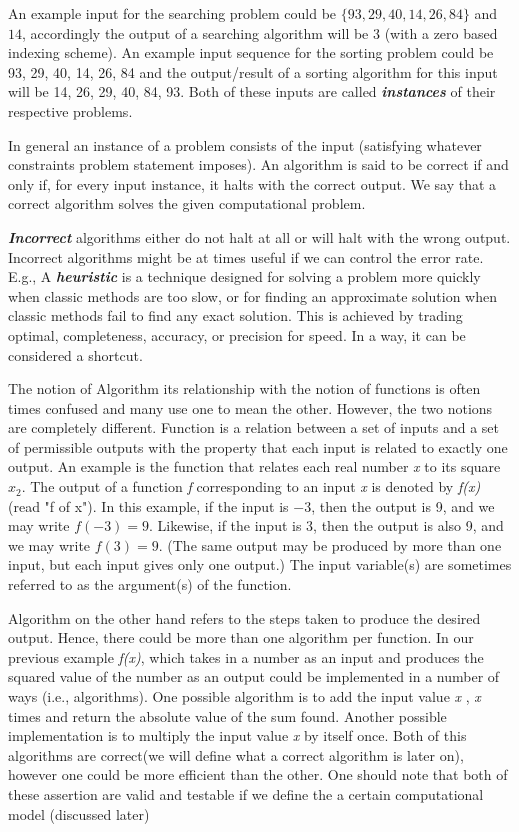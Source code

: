 \documentclass[12pt,a4paper]{book}
\begin{document}
An example input for the searching problem could be $\{93, 29, 40, 14, 26, 84\}$ and $14$, accordingly the output of a searching algorithm will be 3 (with a zero based indexing scheme). An example input sequence for the sorting problem could be {93, 29, 40, 14, 26, 84} and the output/result of a sorting algorithm for this input will be {14, 26, 29, 40, 84, 93}. Both of these inputs are called \textbf{\textit{instances}} of their respective problems.
\par
In general an instance of a problem consists of the input (satisfying whatever constraints problem statement imposes). An algorithm is said to be correct if and only if, for every input instance, it halts with the correct output. We say that a correct algorithm solves the given computational problem. 
\par
\textbf{\textit{Incorrect}} algorithms either do not halt at all or will halt with the wrong output. Incorrect algorithms might be at times useful if we can control the error rate. E.g., A \textbf{\textit{heuristic}} is a technique designed for solving a problem more quickly when classic methods are too slow, or for finding an approximate solution when classic methods fail to find any exact solution. This is achieved by trading optimal, completeness, accuracy, or precision for speed. In a way, it can be considered a shortcut.
\par
The notion of Algorithm its relationship with the notion of functions is often times confused and many use one to mean the other. However, the two notions are completely different. Function is a relation between a set of inputs and a set of permissible outputs with the property that each input is related to exactly one output. An example is the function that relates each real number \textit{x} to its square $x_{2}$. The output of a function \textit{f} corresponding to an input \textit{x} is denoted by \textit{f(x)} (read "f of x"). In this example, if the input is $ -3$, then the output is 9, and we may write $f( -3) = 9$. Likewise, if the input is 3, then the output is also 9, and we may write $f(3) = 9$. (The same output may be produced by more than one input, but each input gives only one output.) The input variable(s) are sometimes referred to as the argument(s) of the function.
\par
Algorithm on the other hand refers to the steps taken to produce the desired output. Hence, there could be more than one algorithm per function. In our previous example \textit{f(x)}, which takes in a number as an input and produces the squared value of the number as an output could be implemented in a number of ways (i.e., algorithms). One possible algorithm is to add the input value \textit{x} , \textit{x} times and return the absolute value of the sum found. Another possible implementation is to multiply the input value \textit{x} by itself once. Both of this algorithms are correct(we will define what a correct algorithm is later on), however one could be more efficient than the other. One should note that both of these assertion are valid and testable if we define the a certain computational model (discussed later)
\end{document}
